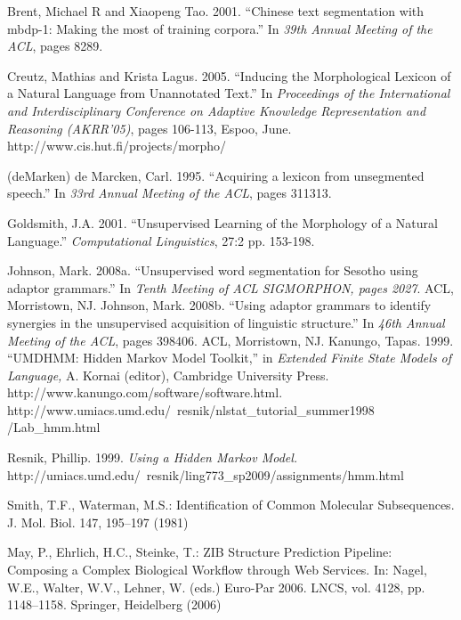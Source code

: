 \documentclass[runningheads,a4paper]{llncs}
\begin{document}
\begin{thebibliography}{4}

 Brent, Michael R and Xiaopeng Tao. 2001. ``Chinese text segmentation with mbdp-1: Making the most of training corpora.'' In \textit{39th Annual Meeting of the ACL}, pages 8289.

 Creutz, Mathias and Krista Lagus. 2005. ``Inducing the Morphological
Lexicon of a Natural Language from Unannotated Text.'' In \textit{Proceedings
of the International and Interdisciplinary Conference on Adaptive
Knowledge Representation and Reasoning (AKRR'05)}, pages 106-113,
Espoo, June. http://www.cis.hut.fi/projects/morpho/


\bibitem(deMarken)	de Marcken, Carl. 1995. ``Acquiring a lexicon from unsegmented speech.'' In \textit{33rd Annual Meeting of the ACL}, pages 311313.

 Goldsmith, J.A. 2001. ``Unsupervised Learning of the Morphology of a Natural Language.'' \textit{Computational Linguistics}, 27:2 pp. 153-198.

 Johnson, Mark. 2008a. ``Unsupervised word segmentation for Sesotho using adaptor grammars.'' In \textit{Tenth Meeting of ACL SIGMORPHON, pages 2027}. ACL, Morristown, NJ.
 Johnson, Mark. 2008b. ``Using adaptor grammars to identify synergies in the unsupervised acquisition of linguistic structure.'' In \textit{46th Annual Meeting of the ACL}, pages 398406. ACL, Morristown, NJ.
 Kanungo, Tapas. 1999. ``UMDHMM: Hidden Markov Model Toolkit,'' in \textit{Extended Finite State Models of Language,} A. Kornai (editor), Cambridge University Press. http://www.kanungo.com/software/software.html. \\
	http://www.umiacs.umd.edu/~resnik/nlstat\_tutorial\_summer1998
	/Lab\_hmm.html
	
	Resnik, Phillip. 1999. \textit{Using a Hidden Markov Model.} http://umiacs.umd.edu/~resnik/ling773\_sp2009/assignments/hmm.html
	


 Smith, T.F., Waterman, M.S.: Identification of Common Molecular
Subsequences. J. Mol. Biol. 147, 195--197 (1981)

 May, P., Ehrlich, H.C., Steinke, T.: ZIB Structure Prediction Pipeline:
Composing a Complex Biological Workflow through Web Services. In: Nagel,
W.E., Walter, W.V., Lehner, W. (eds.) Euro-Par 2006. LNCS, vol. 4128,
pp. 1148--1158. Springer, Heidelberg (2006)


\end{thebibliography}
\end{document}
